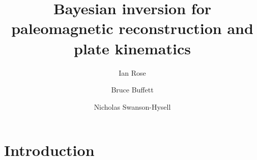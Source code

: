 \documentclass[preprint,12pt,authoryear]{elsarticle}
\begin{document}
\begin{frontmatter}



\title{Bayesian inversion for paleomagnetic reconstruction and plate kinematics}


\author{Ian Rose}
\author{Bruce Buffett}
\author{Nicholas Swanson-Hysell}


\address{}

\begin{abstract}

\end{abstract}

\begin{keyword}



\end{keyword}

\end{frontmatter}

\linenumbers

\section{Introduction}
\label{sec:introduction}
\end{document}
